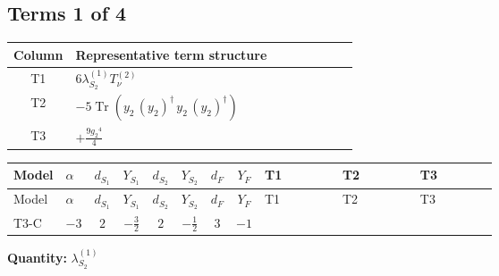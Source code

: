 \documentclass[8pt]{article}
\begin{document}
\begin{landscape}
\subsection*{Terms 1 of 4}
\begin{center}
\begin{tabular}{@{}c >{\raggedright\arraybackslash}p{0.82\linewidth}@{}}
\toprule
Column & Representative term structure \\
\midrule
T1 & \(\displaystyle 6 {\lambda_{S_2}^{(1)}} T_{\nu}^{(2)}\) \\
\midrule
T2 & \(\displaystyle -5 \operatorname{Tr}\!\left({y_2}\,\left({y_2}\right)^{\dagger}\,{y_2}\,\left({y_2}\right)^{\dagger}\right)\) \\
\midrule
T3 & \(\displaystyle +\frac{9 {g_2}^4}{4}\) \\
\midrule
\bottomrule
\end{tabular}
\end{center}
\smallskip
\tiny
\begin{longtable}{@{}llcccccc >{\raggedright\arraybackslash}p{0.21\linewidth} >{\raggedright\arraybackslash}p{0.21\linewidth} >{\raggedright\arraybackslash}p{0.21\linewidth}@{}}
\toprule
Model & $\alpha$ & $d_{S_1}$ & $Y_{S_1}$ & $d_{S_2}$ & $Y_{S_2}$ & $d_F$ & $Y_F$ & T1 & T2 & T3 \\
\midrule
\endfirsthead
\toprule
Model & $\alpha$ & $d_{S_1}$ & $Y_{S_1}$ & $d_{S_2}$ & $Y_{S_2}$ & $d_F$ & $Y_F$ & T1 & T2 & T3 \\
\midrule
\endhead
T3-C & $-3$ & $2$ & $-\frac{3}{2}$ & $2$ & $-\frac{1}{2}$ & $3$ & $-1$ & \scriptsize\adjustbox{max width=\linewidth}{$\begin{gathered} 6 {\lambda_{S_2}^{(1)}} T_{\nu}^{(2)}\end{gathered}$} & \scriptsize\adjustbox{max width=\linewidth}{$\begin{gathered} -5 \operatorname{Tr}\!\left({y_2}\,\left({y_2}\right)^{\dagger}\,{y_2}\,\left({y_2}\right)^{\dagger}\right)\end{gathered}$} & \scriptsize\adjustbox{max width=\linewidth}{$\begin{gathered} +\frac{9 {g_2}^4}{4}\end{gathered}$} \\
\midrule
\bottomrule
\end{longtable}
\clearpage
\noindent\textbf{Quantity: }$\lambda_{S_2}^{(1)}$\par\smallskip

\end{landscape}
\end{document}
